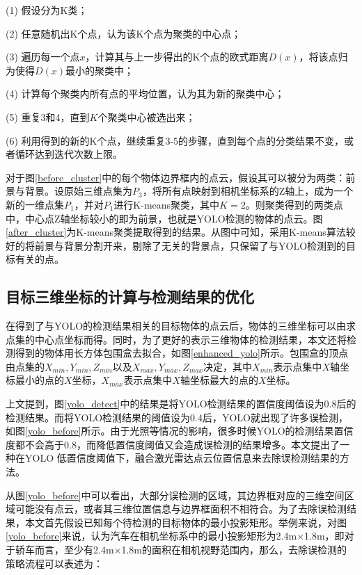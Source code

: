 (1) 假设分为K类；

(2) 任意随机出K个点，认为该K个点为聚类的中心点；

(3) 遍历每一个点$x$，计算其与上一步得出的K个点的欧式距离$D(x)$，将该点归为使得$D(x)$最小的聚类中；

(4) 计算每个聚类内所有点的平均位置，认为其为新的聚类中心；

(5) 重复3和4，直到$K$个聚类中心被选出来；

(6) 利用得到的新的K个点，继续重复3-5的步骤，直到每个点的分类结果不变，或者循环达到迭代次数上限。

对于图\ref{before_cluster}中的每个物体边界框内的点云，假设其可以被分为两类：前景与背景。设原始三维点集为$P_3$，将所有点映射到相机坐标系的Z轴上，成为一个新的一维点集$P_1$，并对$P_1$进行K-means聚类，其中$K=2$。则聚类得到的两类点中，中心点Z轴坐标较小的即为前景，也就是YOLO检测的物体的点云。图\ref{after_cluster}为K-means聚类提取得到的结果。从图中可知，采用K-means算法较好的将前景与背景分割开来，剔除了无关的背景点，只保留了与YOLO检测到的目标有关的点。

\subsection{目标三维坐标的计算与检测结果的优化}

在得到了与YOLO的检测结果相关的目标物体的点云后，物体的三维坐标可以由求点集的中心点坐标而得。同时，为了更好的表示三维物体的检测结果，本文还将检测得到的物体用长方体包围盒去拟合，如图\ref{enhanced_yolo}所示。包围盒的顶点由点集的$X_{min}, Y_{min}, Z_{min}$以及$X_{max}, Y_{max}, Z_{max}$决定，其中$X_{min}$表示点集中$X$轴坐标最小的点的$X$坐标，$X_{max}$表示点集中$X$轴坐标最大的点的$X$坐标。


上文提到，图\ref{yolo_detect}中的结果是将YOLO检测结果的置信度阈值设为0.8后的检测结果。而将YOLO检测结果的阈值设为0.4后，YOLO就出现了许多误检测，如图\ref{yolo_before}所示。由于光照等情况的影响，很多时候YOLO的检测结果置信度都不会高于0.8，而降低置信度阈值又会造成误检测的结果增多。本文提出了一种在YOLO 低置信度阈值下，融合激光雷达点云位置信息来去除误检测结果的方法。

从图\ref{yolo_before}中可以看出，大部分误检测的区域，其边界框对应的三维空间区域可能没有点云，或者其三维位置信息与边界框面积不相符合。为了去除误检测结果，本文首先假设已知每个待检测的目标物体的最小投影矩形。举例来说，对图\ref{yolo_before}来说，认为汽车在相机坐标系中的最小投影矩形为2.4m$\times$1.8m，即对于轿车而言，至少有2.4m$\times$1.8m的面积在相机视野范围内，那么，去除误检测的策略流程可以表述为：

